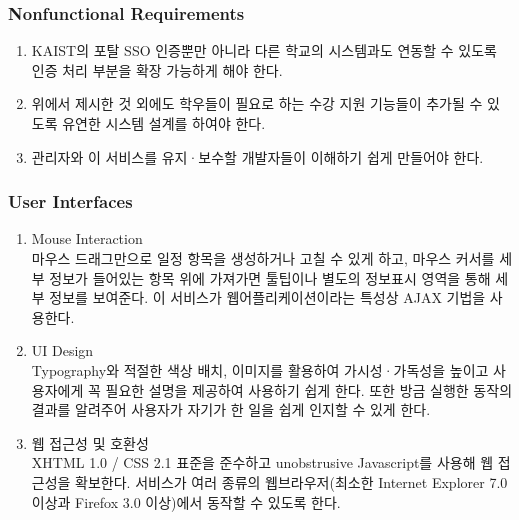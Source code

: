 \documentclass[a4paper,titlepage]{article}
\begin{document}
\subsubsection{Nonfunctional Requirements}
\begin{enumerate}
	\item KAIST의 포탈 SSO 인증뿐만 아니라 다른 학교의 시스템과도 연동할 수 있도록 인증 처리 부분을 확장 가능하게 해야 한다.
	\item 위에서 제시한 것 외에도 학우들이 필요로 하는 수강 지원 기능들이 추가될 수 있도록 유연한 시스템 설계를 하여야 한다.
	\item 관리자와 이 서비스를 유지·보수할 개발자들이 이해하기 쉽게 만들어야 한다.
\end{enumerate}
\subsubsection{User Interfaces}
\begin{enumerate}
	\item Mouse Interaction\\
	마우스 드래그만으로 일정 항목을 생성하거나 고칠 수 있게 하고, 마우스 커서를 세부 정보가 들어있는 항목 위에 가져가면 툴팁이나 별도의 정보표시 영역을 통해 세부 정보를 보여준다.
	이 서비스가 웹어플리케이션이라는 특성상 AJAX 기법을 사용한다. 
	\item UI Design\\
	Typography와 적절한 색상 배치, 이미지를 활용하여 가시성·가독성을 높이고 사용자에게 꼭 필요한 설명을 제공하여 사용하기 쉽게 한다.
	또한 방금 실행한 동작의 결과를 알려주어 사용자가 자기가 한 일을 쉽게 인지할 수 있게 한다.
	\item 웹 접근성 및 호환성\\
	XHTML 1.0 / CSS 2.1 표준을 준수하고 unobstrusive Javascript를 사용해 웹 접근성을 확보한다.
	서비스가 여러 종류의 웹브라우저(최소한 Internet Explorer 7.0 이상과 Firefox 3.0 이상)에서 동작할 수 있도록 한다. 
\end{enumerate}
\end{document}
